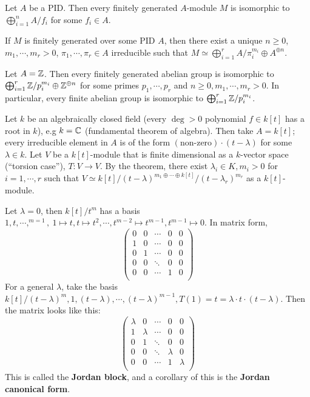     \begin{theorem}
        Let $A$ be a PID. Then every finitely generated $A$-module $M$ is isomorphic to $\bigoplus _{i=1}^n A / f_i$ for some $f _i \in A$.
    \end{theorem}
    \begin{theorem}
        If $M$ is finitely generated over some PID  $A$, then there exist a unique $n \geq 0$, $m_1, \cdots , m_r >0$, $\pi_1, \cdots ,\pi_r \in A$ irreducible such that $M \simeq  \bigoplus _{i=1}^r A / \pi_i ^{m_i }\oplus A^{\oplus n}$.
    \end{theorem}
    \begin{cor}
        Let $A=\mathbb{Z}$. Then every finitely generated abelian group is isomorphic to $\bigoplus _{i=1}^r \mathbb{Z} / p_i  ^{m_i }\oplus \mathbb{Z} ^{\oplus n}$ for some primes $p_1, \cdots ,p_r$ and $n\geq 0, m_1,\cdots ,m_r>0$. In particular, every finite abelian group is isomorphic to $\bigoplus _{i=1}^r \mathbb{Z} / p_i  ^{m_i }$.
    \end{cor}
    Let $k$ be an algebraically closed field (every $\deg >0$ polynomial $f \in k[t]$ has a root in $k$), e.g $k=\mathbb{C}$ (fundamental theorem of algebra). Then take $A=k[t]$; every irreducible element in $A$ is of the form $(\text{non-zero})\cdot (t-\lambda)$ for some $\lambda \in k$. Let $V$ be a $k[t]$-module that is finite dimensional as a  $k$-vector space (``torsion case''), $T \colon V \to V$. By the theorem, there exist $\lambda_i \in K, m _i  >0$ for $i=1,\cdots ,r$ such that $V \simeq  k[t] / (t-\lambda) ^{m_1\oplus \cdots \oplus k[t]} / (t-\lambda_r)^{m_r}$ as a  $k[t]$-module.
    \begin{example}
        Let $\lambda=0$, then $k[t] / t^m$ has a basis  $1, t , \cdots , ^{m=1},\ 1 \mapsto t, t \mapsto t^2, \cdots , t ^{m-2 }\mapsto  t ^{m-1}, t ^{m-1}\mapsto 0$. In matrix form, \[
        \begin{pmatrix}
            0 & 0 & \cdots  & 0 &0\\
            1 & 0 & \cdots  & 0&0\\
            0 & 1 & \cdots  & 0&0\\
            0 & 0 & \ddots  & 0&0\\
            0 & 0 & \cdots  & 1&0\\
        \end{pmatrix}
    \] For a general $\lambda$, take the basis $k[t] / (t- \lambda)^m, 1, (t-\lambda), \cdots ,(t-\lambda)^{m-1}, T(1)=t=\lambda\cdot t\cdot (t-\lambda)$. Then the matrix looks like this:\[
        \begin{pmatrix}
            \lambda & 0 & \cdots  & 0 &0\\
            1 & \lambda & \cdots  & 0&0\\
            0 & 1 & \ddots  & 0&0\\
            0 & 0 & \ddots  & \lambda&0\\
            0 & 0 & \cdots  & 1&\lambda\\
        \end{pmatrix}
    \]This is called the \textbf{Jordan block}, and a corollary of this is the \textbf{Jordan canonical form}.
    \end{example}
